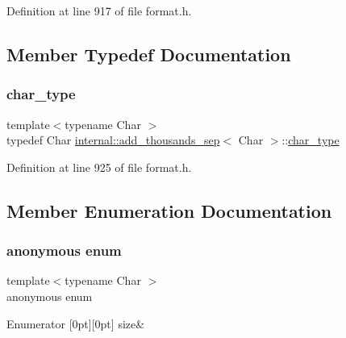 Definition at line 917 of file format.\+h.



\subsection{Member Typedef Documentation}
\mbox{\label{classinternal_1_1add__thousands__sep_af64be52350735e91034ea2ca6bd43481}} 
\subsubsection{\texorpdfstring{char\+\_\+type}{char\_type}}
{\footnotesize\ttfamily template$<$typename Char $>$ \\
typedef Char \hyperlink{classinternal_1_1add__thousands__sep}{internal\+::add\+\_\+thousands\+\_\+sep}$<$ Char $>$\+::\hyperlink{classinternal_1_1add__thousands__sep_af64be52350735e91034ea2ca6bd43481}{char\+\_\+type}}



Definition at line 925 of file format.\+h.



\subsection{Member Enumeration Documentation}
\mbox{\label{classinternal_1_1add__thousands__sep_ae0d58a058f1e161a84192d6bedc42ad6}} 
\subsubsection{\texorpdfstring{anonymous enum}{anonymous enum}}
{\footnotesize\ttfamily template$<$typename Char $>$ \\
anonymous enum}

\begin{DoxyEnumFields}{Enumerator}
[0pt][0pt]{}\mbox{\label{classinternal_1_1add__thousands__sep_ae0d58a058f1e161a84192d6bedc42ad6a334d3f7a2d1967799e0196e1eac1f1be}} 
size&\\
\hline

\end{DoxyEnumFields}


